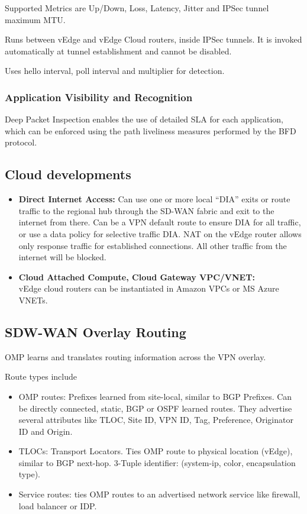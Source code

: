 Supported Metrics are Up/Down, Loss, Latency, Jitter and IPSec tunnel maximum MTU.

Runs between vEdge and vEdge Cloud routers, inside IPSec tunnels. It is invoked automatically at 
tunnel establishment and cannot be disabled.

Uses hello interval, poll interval and multiplier for detection.

\subsubsection{Application Visibility and Recognition}
Deep Packet Inspection enables the use of detailed SLA for each application, which can be enforced using the path 
liveliness measures performed by the BFD protocol. 

\subsection{Cloud developments}
\begin{itemize}
    \item \textbf{Direct Internet Access:} Can use one or more local ``DIA'' exits or route traffic to the regional 
    hub through the SD-WAN fabric and exit to the internet from there. Can be a VPN default route to ensure DIA for all traffic, or use a data policy for selective traffic DIA.
    NAT on the vEdge router allows only response traffic for established connections. All other traffic from the internet will be blocked.
    \item \textbf{Cloud Attached Compute, Cloud Gateway VPC/VNET:} \\
    vEdge cloud routers can be instantiated in Amazon VPCs or MS Azure VNETs. 
\end{itemize}

\subsection{SDW-WAN Overlay Routing}
OMP learns and translates routing information across the VPN overlay.

Route types include 
\begin{itemize}
    \item OMP routes: Prefixes learned from site-local, similar to BGP Prefixes. Can be directly connected, static, BGP or OSPF learned routes.
        They advertise several attributes like TLOC, Site ID, VPN ID, Tag, Preference, Originator ID and Origin.
    \item TLOCs: Transport Locators. Ties OMP route to physical location (vEdge), similar to BGP next-hop. 
        3-Tuple identifier: (system-ip, color, encapsulation type).
    \item Service routes: ties OMP routes to an advertised network service like firewall, load balancer or IDP.
\end{itemize}